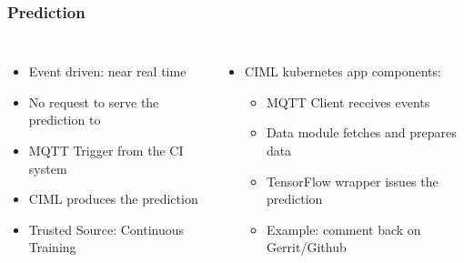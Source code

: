 \documentclass[aspectratio=169,11pt,hyperref={colorlinks=true}]{beamer}
\begin{document}
\begin{frame}
    \frametitle{Prediction}
    \begin{columns}
        \begin{itemize}
            \item{Event driven: near real time}
            \item{No request to serve the prediction to}
            \item{MQTT Trigger from the CI system}
            \item{CIML produces the prediction}
            \item{Trusted Source: Continuous Training}
        \end{itemize}
        \begin{itemize}
          \item{CIML kubernetes app components:}
          \begin{itemize}
            \item{MQTT Client receives events}
            \item{Data module fetches and prepares data}
            \item{TensorFlow wrapper issues the prediction}
            \item{Example: comment back on Gerrit/Github}
          \end{itemize}
        \end{itemize}
    \end{columns}
\end{frame}
\end{document}
